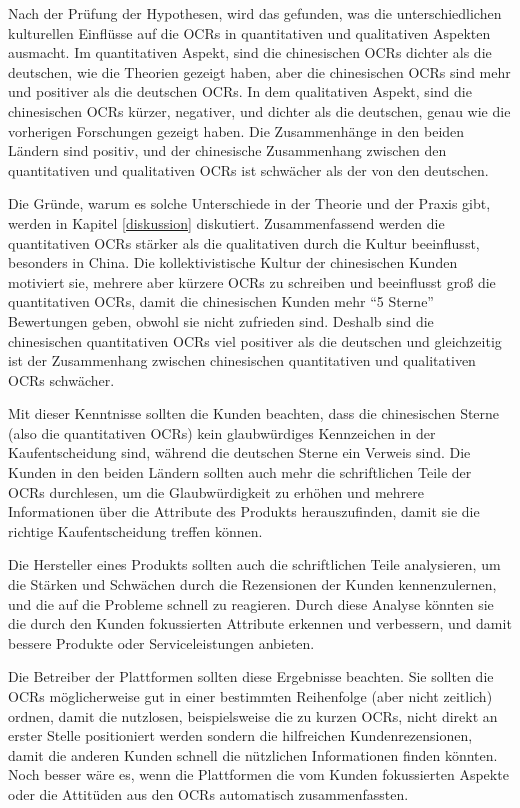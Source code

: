 Nach der Prüfung der Hypothesen, wird das gefunden, was die unterschiedlichen kulturellen  Einflüsse auf die \ac{OCRs} in quantitativen und qualitativen Aspekten ausmacht. Im quantitativen Aspekt, sind die chinesischen \ac{OCRs} dichter als die deutschen, wie die Theorien gezeigt haben, aber die chinesischen \ac{OCRs} sind mehr und positiver als die deutschen \ac{OCRs}. In dem qualitativen Aspekt, sind die chinesischen \ac{OCRs} kürzer, negativer, und dichter als die deutschen, genau wie die vorherigen Forschungen gezeigt haben. Die Zusammenhänge in den beiden Ländern sind positiv, und der chinesische Zusammenhang zwischen den quantitativen und qualitativen \ac{OCRs} ist schwächer als der von den deutschen.

Die Gründe, warum es solche Unterschiede in der Theorie und der Praxis gibt, werden in Kapitel \ref{diskussion} diskutiert. Zusammenfassend werden die quantitativen \ac{OCRs} stärker als die qualitativen durch die Kultur beeinflusst, besonders in China. Die kollektivistische Kultur der chinesischen Kunden motiviert sie, mehrere aber kürzere \ac{OCRs} zu schreiben und beeinflusst groß die quantitativen \ac{OCRs}, damit die chinesischen Kunden mehr ``5 Sterne'' Bewertungen geben, obwohl sie nicht zufrieden sind. Deshalb sind die chinesischen quantitativen \ac{OCRs} viel positiver als die deutschen und gleichzeitig ist der Zusammenhang zwischen chinesischen quantitativen und qualitativen \ac{OCRs} schwächer. 

Mit dieser Kenntnisse sollten die Kunden beachten, dass die chinesischen Sterne (also die quantitativen \ac{OCRs}) kein glaubwürdiges Kennzeichen in der Kaufentscheidung sind, während die deutschen Sterne ein Verweis sind. Die Kunden in den beiden Ländern sollten auch mehr die schriftlichen Teile der \ac{OCRs} durchlesen, um die Glaubwürdigkeit zu erhöhen und mehrere Informationen über die Attribute des Produkts herauszufinden, damit sie die richtige Kaufentscheidung treffen können.

Die Hersteller eines Produkts sollten auch die schriftlichen Teile analysieren, um die Stärken und Schwächen durch die Rezensionen der Kunden kennenzulernen, und die auf die Probleme schnell zu reagieren. Durch diese Analyse könnten sie die durch den Kunden fokussierten Attribute erkennen und verbessern, und damit bessere Produkte oder Serviceleistungen anbieten.

Die Betreiber der Plattformen sollten diese Ergebnisse beachten. Sie sollten die \ac{OCRs} möglicherweise gut in einer bestimmten Reihenfolge (aber nicht zeitlich) ordnen, damit die nutzlosen, beispielsweise die zu kurzen \ac{OCRs}, nicht direkt an erster Stelle positioniert werden sondern die hilfreichen Kundenrezensionen, damit die anderen Kunden schnell die nützlichen Informationen finden könnten. Noch besser wäre es, wenn die Plattformen die vom Kunden fokussierten Aspekte oder die Attitüden aus den \ac{OCRs} automatisch zusammenfassten.
